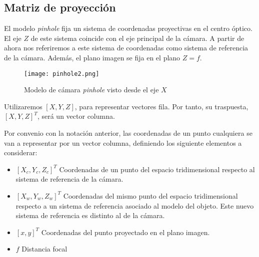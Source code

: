 


\subsection{Matriz de proyección}\label{subsec:matproy}
El modelo \textit{pinhole} \cite{Hartley} fija un sistema de coordenadas proyectivas en el centro óptico. El eje $Z$ de este sistema coincide con el eje principal de la cámara. A partir de ahora nos referiremos a este sistema de coordenadas como sistema de referencia de la cámara. Además, el plano imagen se fija en el plano $Z = f$.

\begin{figure}[h]
  \centering
  \texttt{[image: pinhole2.png]}
  \caption{Modelo de cámara \textit{pinhole} visto desde el eje $X$}
  \label{fig:pinholeCamera2}
\end{figure}

Utilizaremos $[X, Y, Z]$, para representar vectores fila. Por tanto, su traspuesta, $[X, Y, Z]^T$, será un vector columna. 

Por convenio con la notación anterior, las coordenadas de un punto cualquiera se van a representar por un vector columna, definiendo los siguiente elementos a considerar:
\begin{itemize}
\item $[X_c , Y_c , Z_c ]^T$ Coordenadas de un punto del espacio tridimensional respecto al sistema de referencia de la cámara.
\item $[X_w , Y_w , Z_w ]^T$ Coordenadas del mismo punto del espacio tridimensional respecto a un sistema de referencia asociado al modelo del objeto. Este nuevo sistema de referencia es distinto al de la cámara.
\item $[x, y]^T$  Coordenadas del punto proyectado en el plano imagen.
\item $f$  Distancia focal
\end{itemize}

